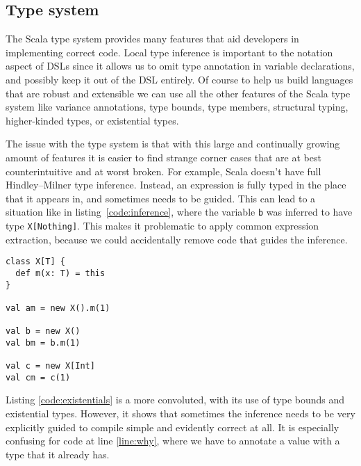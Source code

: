 \subsection{Type system}

The Scala type system provides many features that aid developers in implementing correct code. Local type inference is important to the notation aspect of DSLs since it allows us to omit type annotation in variable declarations, and possibly keep it out of the DSL entirely. Of course to help us build languages that are robust and extensible we can use all the other features of the Scala type system like variance annotations, type bounds, type members, structural typing, higher-kinded types, or existential types.

The issue with the type system is that with this large and continually growing amount of features it is easier to find strange corner cases that are at best counterintuitive and at worst broken. For example, Scala doesn't have full Hindley–Milner type inference. Instead, an expression is fully typed in the place that it appears in, and sometimes needs to be guided. This can lead to a situation like in listing~\ref{code:inference}, where the variable \texttt{b} was inferred to have type \texttt{X[Nothing]}. This makes it problematic to apply common expression extraction, because we could accidentally remove code that guides the inference.

\begin{lstlisting}[caption=Local inference, label=code:inference]
class X[T] {
  def m(x: T) = this
}

val am = new X().m(1)

val b = new X()
val bm = b.m(1)

val c = new X[Int]
val cm = c(1)
\end{lstlisting}

Listing \ref{code:existentials} is a more convoluted, with its use of type bounds and existential types. However, it shows that sometimes the inference needs to be very explicitly guided to compile simple and evidently correct at all. It is especially confusing for code at line \ref{line:why}, where we have to annotate a value with a type that it already has.


